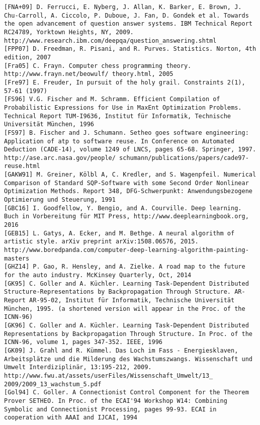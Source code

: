\documentclass[10pt]{article}
\begin{document}
\begin{verbatim}
[FNA+09] D. Ferrucci, E. Nyberg, J. Allan, K. Barker, E. Brown, J. Chu-Carroll, A. Ciccolo, P. Duboue, J. Fan, D. Gondek et al. Towards the open advancement of question answer systems. IBM Technical Report RC24789, Yorktown Heights, NY, 2009. http://www.research.ibm.com/deepqa/question_answering.shtml
[FPP07] D. Freedman, R. Pisani, and R. Purves. Statistics. Norton, 4th edition, 2007
[Fra05] C. Frayn. Computer chess programming theory. http://www.frayn.net/beowulf/ theory.html, 2005
[Fre97] E. Freuder, In pursuit of the holy grail. Constraints 2(1), 57-61 (1997)
[FS96] V.G. Fischer and M. Schramm. Efficient Compilation of Probabilistic Expressions for Use in MaxEnt Optimization Problems. Technical Report TUM-I9636, Institut für Informatik, Technische Universität München, 1996
[FS97] B. Fischer and J. Schumann. Setheo goes software engineering: Application of atp to software reuse. In Conference on Automated Deduction (CADE-14), volume 1249 of LNCS, pages 65-68. Springer, 1997. http://ase.arc.nasa.gov/people/ schumann/publications/papers/cade97-reuse.html
[GAKW91] M. Greiner, Kölbl A, C. Kredler, and S. Wagenpfeil. Numerical Comparison of Standard SQP-Software with some Second Order Nonlinear Optimization Methods. Report 348, DFG-Schwerpunkt: Anwendungsbezogene Optimierung und Steuerung, 1991
[GBC16] I. Goodfellow, Y. Bengio, and A. Courville. Deep learning. Buch in Vorbereitung für MIT Press, http://www.deeplearningbook.org, 2016
[GEB15] L. Gatys, A. Ecker, and M. Bethge. A neural algorithm of artistic style. arXiv preprint arXiv:1508.06576, 2015. http://www.boredpanda.com/computer-deep-learning-algorithm-painting-masters
[GHZ14] P. Gao, R. Hensley, and A. Zielke. A road map to the future for the auto industry. McKinsey Quarterly, Oct, 2014
[GK95] C. Goller and A. Küchler. Learning Task-Dependent Distributed Structure-Representations by Backpropagation Through Structure. AR-Report AR-95-02, Institut für Informatik, Technische Universität München, 1995. (a shortened version will appear in the Proc. of the ICNN-96)
[GK96] C. Goller and A. Küchler. Learning Task-Dependent Distributed Representations by Backpropagation Through Structure. In Proc. of the ICNN-96, volume 1, pages 347-352. IEEE, 1996
[GK09] J. Grahl and R. Kümmel. Das Loch im Fass - Energiesklaven, Arbeitsplätze und die Milderung des Wachstumszwangs. Wissenschaft und Umwelt Interdiziplinär, 13:195-212, 2009. http://www.fwu.at/assets/userFiles/Wissenschaft_Umwelt/13_ 2009/2009_13_wachstum_5.pdf
[Gol94] C. Goller. A Connectionist Control Component for the Theorem Prover SETHEO. In Proc. of the ECAI'94 Workshop W14: Combining Symbolic and Connectionist Processing, pages 99-93. ECAI in cooperation with AAAI and IJCAI, 1994

\end{verbatim}
\end{document}
